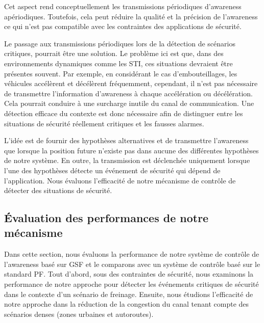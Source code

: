 Cet aspect rend conceptuellement les transmissions périodiques d'awareness apériodiques. Toutefois, cela peut réduire la qualité et la précision de l'awareness ce qui n'est pas compatible avec les contraintes des applications de sécurité.

Le passage aux transmissions périodiques lors de la détection de scénarios critiques, pourrait être une solution. Le problème ici est que, dans des environnements dynamiques comme les STI, ces situations devraient être présentes souvent. Par exemple, en considérant le cas d'embouteillages, les véhicules accélèrent et décélèrent fréquemment, cependant, il n'est pas nécessaire de transmettre l'information d'awareness à chaque accélération ou décélération. Cela pourrait conduire à une surcharge inutile du canal de communication. Une détection efficace du contexte est donc nécessaire afin de distinguer entre les situations de sécurité réellement critiques et les fausses alarmes.

L'idée est de fournir des hypothèses alternatives et de transmettre l'awareness que lorsque la position future n'existe pas dans aucune des différentes hypothèses de notre système. En outre, la transmission est déclenchée uniquement lorsque l'une des hypothèses détecte un événement de sécurité qui dépend de l'application. Nous évaluons l'efficacité de notre mécanisme de contrôle de détecter des situations de sécurité.

\subsection{Évaluation des performances de notre mécanisme}

Dans cette section, nous évaluons la performance de notre système de contrôle de l'awareness basé sur GSF et le comparons avec un système de contrôle basé sur le standard PF. Tout d'abord, sous des contraintes de sécurité, nous examinons la performance de notre approche pour détecter les événements critiques de  sécurité dans le contexte d'un scénario de freinage. Ensuite, nous étudions l'efficacité de notre approche dans la réduction de la congestion du canal tenant compte des scénarios denses (zones urbaines et autoroutes).

